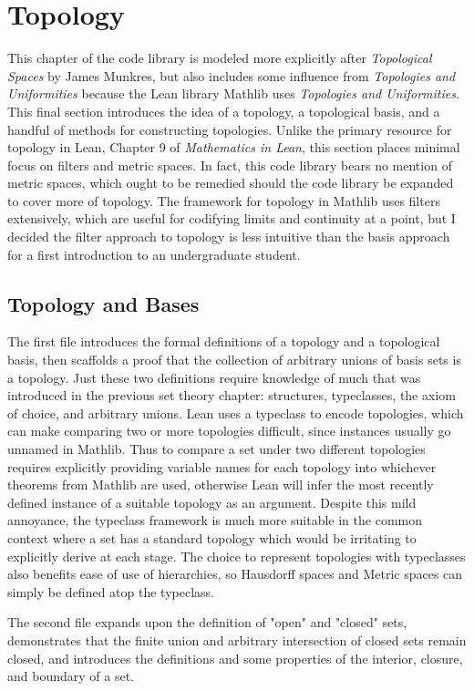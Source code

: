 \section{Topology}

This chapter of the code library is modeled more explicitly after 
\textit{Topological Spaces} by James Munkres, but also includes
some influence from \textit{Topologies and Uniformities} because 
the Lean library Mathlib uses \textit{Topologies and Uniformities}.
This final section introduces the idea of a topology, a topological basis,
and a handful of methods for constructing topologies. Unlike the primary 
resource for topology in Lean, Chapter 9 of \textit{Mathematics in Lean}, 
this section places minimal focus on filters and metric spaces. In fact, 
this code library bears no mention of metric spaces, which ought to
be remedied should the code library be expanded to cover more of topology.
The framework for topology in Mathlib uses filters extensively, which
are useful for codifying limits and continuity at a point, but I decided 
the filter approach to topology is less intuitive than the basis 
approach for a first introduction to an undergraduate student.

\subsection{Topology and Bases}

The first file introduces the formal definitions of a topology and a 
topological basis, then scaffolds a proof that the collection of arbitrary
unions of basis sets is a topology. Just these two definitions require 
knowledge of much that was introduced in the previous set theory chapter:
structures, typeclasses, the axiom of choice, and arbitrary unions. Lean
uses a typeclass  to encode topologies, which can 
make comparing two or more topologies difficult, since instances usually
go unnamed in Mathlib. Thus to compare a set under two different topologies
requires explicitly providing variable names for each topology into whichever
theorems from Mathlib are used, otherwise Lean will infer the most recently 
defined instance of a suitable topology as an argument. Despite this mild 
annoyance, the typeclass framework is much more suitable in the common context 
where a set has a standard topology which would be irritating to explicitly 
derive at each stage. The choice to represent topologies with typeclasses also 
benefits ease of use of hierarchies, so Hausdorff spaces and Metric spaces can 
simply be defined atop the  typeclass.

The second file expands upon the definition of "open" and "closed" sets, 
demonstrates that the finite union and arbitrary intersection of closed sets
remain closed, and introduces the definitions and some properties of the 
interior, closure, and boundary of a set.
